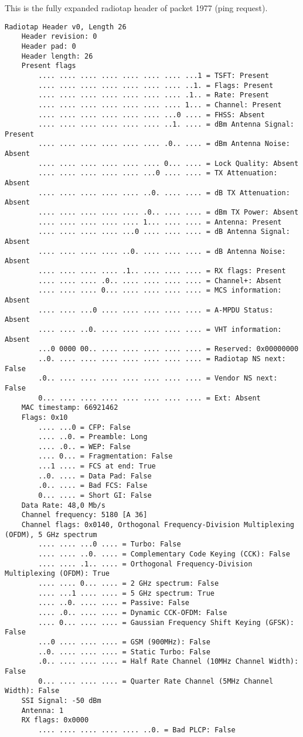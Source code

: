 This is the fully expanded radiotap header of packet 1977 (ping request).
\begin{lstlisting}
Radiotap Header v0, Length 26
    Header revision: 0
    Header pad: 0
    Header length: 26
    Present flags
        .... .... .... .... .... .... .... ...1 = TSFT: Present
        .... .... .... .... .... .... .... ..1. = Flags: Present
        .... .... .... .... .... .... .... .1.. = Rate: Present
        .... .... .... .... .... .... .... 1... = Channel: Present
        .... .... .... .... .... .... ...0 .... = FHSS: Absent
        .... .... .... .... .... .... ..1. .... = dBm Antenna Signal: Present
        .... .... .... .... .... .... .0.. .... = dBm Antenna Noise: Absent
        .... .... .... .... .... .... 0... .... = Lock Quality: Absent
        .... .... .... .... .... ...0 .... .... = TX Attenuation: Absent
        .... .... .... .... .... ..0. .... .... = dB TX Attenuation: Absent
        .... .... .... .... .... .0.. .... .... = dBm TX Power: Absent
        .... .... .... .... .... 1... .... .... = Antenna: Present
        .... .... .... .... ...0 .... .... .... = dB Antenna Signal: Absent
        .... .... .... .... ..0. .... .... .... = dB Antenna Noise: Absent
        .... .... .... .... .1.. .... .... .... = RX flags: Present
        .... .... .... .0.. .... .... .... .... = Channel+: Absent
        .... .... .... 0... .... .... .... .... = MCS information: Absent
        .... .... ...0 .... .... .... .... .... = A-MPDU Status: Absent
        .... .... ..0. .... .... .... .... .... = VHT information: Absent
        ...0 0000 00.. .... .... .... .... .... = Reserved: 0x00000000
        ..0. .... .... .... .... .... .... .... = Radiotap NS next: False
        .0.. .... .... .... .... .... .... .... = Vendor NS next: False
        0... .... .... .... .... .... .... .... = Ext: Absent
    MAC timestamp: 66921462
    Flags: 0x10
        .... ...0 = CFP: False
        .... ..0. = Preamble: Long
        .... .0.. = WEP: False
        .... 0... = Fragmentation: False
        ...1 .... = FCS at end: True
        ..0. .... = Data Pad: False
        .0.. .... = Bad FCS: False
        0... .... = Short GI: False
    Data Rate: 48,0 Mb/s
    Channel frequency: 5180 [A 36]
    Channel flags: 0x0140, Orthogonal Frequency-Division Multiplexing (OFDM), 5 GHz spectrum
        .... .... ...0 .... = Turbo: False
        .... .... ..0. .... = Complementary Code Keying (CCK): False
        .... .... .1.. .... = Orthogonal Frequency-Division Multiplexing (OFDM): True
        .... .... 0... .... = 2 GHz spectrum: False
        .... ...1 .... .... = 5 GHz spectrum: True
        .... ..0. .... .... = Passive: False
        .... .0.. .... .... = Dynamic CCK-OFDM: False
        .... 0... .... .... = Gaussian Frequency Shift Keying (GFSK): False
        ...0 .... .... .... = GSM (900MHz): False
        ..0. .... .... .... = Static Turbo: False
        .0.. .... .... .... = Half Rate Channel (10MHz Channel Width): False
        0... .... .... .... = Quarter Rate Channel (5MHz Channel Width): False
    SSI Signal: -50 dBm
    Antenna: 1
    RX flags: 0x0000
        .... .... .... .... .... ..0. = Bad PLCP: False
\end{lstlisting}
